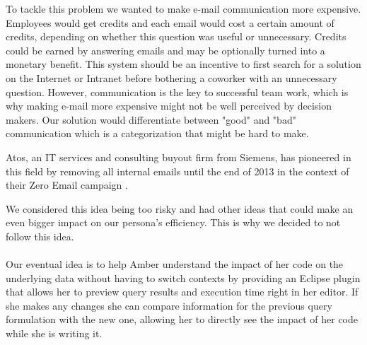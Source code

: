 To tackle this problem we wanted to make e-mail communication more expensive. Employees would get credits and each email would cost a certain amount of credits, depending on whether this question was useful or unnecessary. Credits could be earned by answering emails and may be optionally turned into a monetary benefit.
This system should be an incentive to first search for a solution on the Internet or Intranet before bothering a coworker with an unnecessary question.
However, communication is the key to successful team work, which is why making e-mail more expensive might not be well perceived by decision makers. Our solution would differentiate between "good" and "bad" communication which is a categorization that might be hard to make.

Atos, an IT services and consulting buyout firm from Siemens, has pioneered in this field by removing all internal emails until the end of 2013 in the context of their Zero Email campaign \cite{zero_email}.

We considered this idea being too risky and had other ideas that could make an even bigger impact on our persona's efficiency. This is why we decided to not follow this idea.

\paragraph{}
Our eventual idea is to help Amber understand the impact of her code on the underlying data without having to switch contexts by providing an Eclipse plugin that allows her to preview query results and execution time right in her editor. If she makes any changes she can compare information for the previous query formulation with the new one, allowing her to directly see the impact of her code while she is writing it.